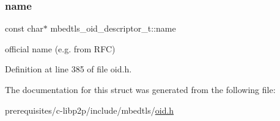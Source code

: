 \subsubsection{\texorpdfstring{name}{name}}
{\footnotesize\ttfamily const char$\ast$ mbedtls\+\_\+oid\+\_\+descriptor\+\_\+t\+::name}

official name (e.\+g. from R\+FC) 

Definition at line 385 of file oid.\+h.



The documentation for this struct was generated from the following file\+:\begin{DoxyCompactItemize}
\item 
prerequisites/c-\/libp2p/include/mbedtls/\mbox{\hyperlink{oid_8h}{oid.\+h}}\end{DoxyCompactItemize}
